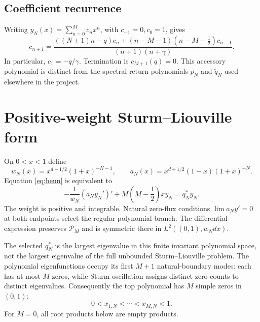 \documentclass[11pt]{article}
\newcommand{\Poly}{\mathcal P}
\begin{document}
\subsection{Coefficient recurrence}
Writing $y_N(x)=\sum_{n=0}^Mc_nx^n$, with $c_{-1}=0,c_0=1$, gives
\begin{equation}\label{eq:rec}
 c_{n+1}=
 \frac{((N+1)n-q)c_n+(n-M-1)(n-M-\frac12)c_{n-1}}
 {(n+1)(n+\gamma)}.
\end{equation}
In particular, $c_1=-q/\gamma$. Termination is $c_{M+1}(q)=0$.
This accessory polynomial is distinct from the spectral-return
polynomials $p_N$ and $\widetilde q_N$ used elsewhere in the project.

\section{Positive-weight Sturm--Liouville form}
On $0<x<1$ define
\[
 w_N(x)=x^{d-1/2}(1+x)^{-N-1},\qquad
 a_N(x)=x^{d+1/2}(1-x)(1+x)^{-N}.
\]
Equation \eqref{eq:heun} is equivalent to
\begin{equation}\label{eq:SL}
 -\frac1{w_N}(a_Ny_N')'
 +M\left(M-\frac12\right)xy_N=q_N^*y_N.
\end{equation}
The weight is positive and integrable. Natural zero-flux conditions
$\lim a_Ny'=0$ at both endpoints select the regular polynomial branch.
The differential expression preserves $\Poly_M$ and is symmetric there
in $L^2((0,1),w_Ndx)$.

The selected $q_N^*$ is the largest eigenvalue in this finite invariant
polynomial space, not the largest eigenvalue of the full unbounded
Sturm--Liouville problem. The polynomial eigenfunctions occupy its
first $M+1$ natural-boundary modes: each has at most $M$ zeros, while
Sturm oscillation assigns distinct zero counts to distinct eigenvalues.
Consequently the top polynomial has $M$ simple zeros in $(0,1)$:
\begin{equation}\label{eq:zeros}
 0<x_{1,N}<\cdots<x_{M,N}<1.
\end{equation}
For $M=0$, all root products below are empty products.
\end{document}
